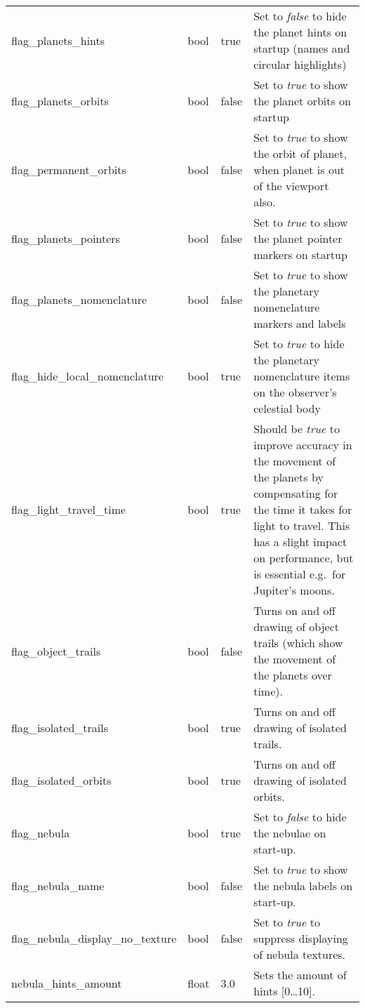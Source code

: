 \begin{longtable}{l|l|l|p{55mm}}
flag\_planets\_hints               & bool   & true  & Set to \emph{false} to hide the planet hints on startup (names and circular highlights)\\%
flag\_planets\_orbits              & bool   & false & Set to \emph{true} to show the planet orbits on startup\\%
flag\_permanent\_orbits            & bool   & false & Set to \emph{true} to show the orbit of planet, when planet is out of the viewport also.\\%
flag\_planets\_pointers            & bool   & false & Set to \emph{true} to show the planet pointer markers on startup\\%
flag\_planets\_nomenclature        & bool   & false & Set to \emph{true} to show the planetary nomenclature markers and labels\\%
flag\_hide\_local\_nomenclature    & bool   & true & Set to \emph{true} to hide the planetary nomenclature items on the observer's celestial body\\\midrule
%
flag\_light\_travel\_time          & bool   & true  & Should be \emph{true} to improve accuracy in the movement of the planets by compensating 
                                           for the time it takes for light to travel. This has a slight impact on performance, 
                                           but is essential e.g.\ for Jupiter's moons.\\%
flag\_object\_trails               & bool   & false & Turns on and off drawing of object trails (which show the movement of the planets over time).\\%
flag\_isolated\_trails             & bool   & true  & Turns on and off drawing of isolated trails.\\%
flag\_isolated\_orbits             & bool   & true  & Turns on and off drawing of isolated orbits.\\\midrule
%
flag\_nebula                       & bool   & true  & Set to \emph{false} to hide the nebulae on start-up. \\%
flag\_nebula\_name                 & bool   & false & Set to \emph{true} to show the nebula labels on start-up. \\%
flag\_nebula\_display\_no\_texture & bool   & false & Set to \emph{true} to suppress displaying of nebula textures. \\%
nebula\_hints\_amount              & float  & 3.0   & Sets the amount of hints [0\ldots10]. \\%

\end{longtable}
